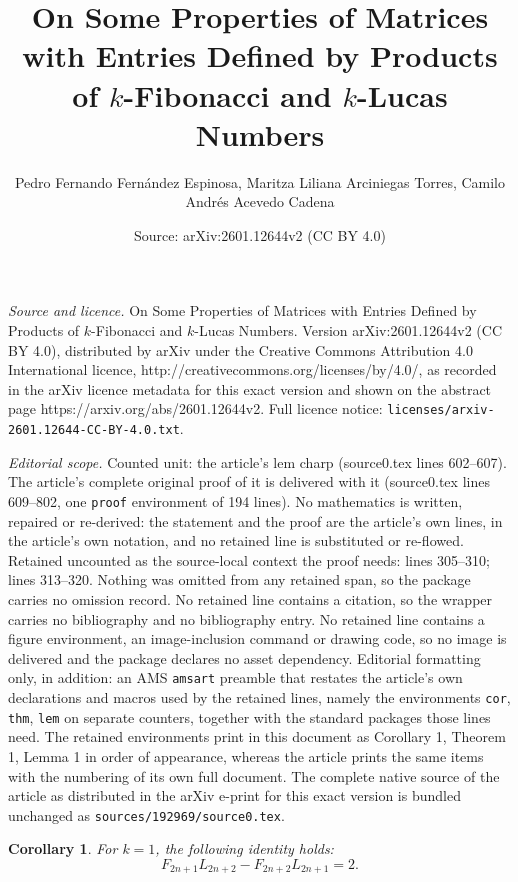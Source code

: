 \documentclass[10pt,a4paper]{amsart}
\title{On Some Properties of Matrices with Entries Defined by Products of $k$-Fibonacci and $k$-Lucas Numbers}
\author{Pedro Fernando Fern\'andez Espinosa, Maritza Liliana Arciniegas Torres, Camilo Andr\'es Acevedo Cadena}
\date{Source: arXiv:2601.12644v2 (CC BY 4.0)}
\newtheorem{cor}{Corollary}
\begin{document}
\maketitle

\noindent\emph{Source and licence.} On Some Properties of Matrices with Entries Defined by Products of $k$-Fibonacci and $k$-Lucas Numbers. Version arXiv:2601.12644v2 (CC BY 4.0), distributed by arXiv under the Creative Commons Attribution 4.0 International licence, http://creativecommons.org/licenses/by/4.0/, as recorded in the arXiv licence metadata for this exact version and shown on the abstract page https://arxiv.org/abs/2601.12644v2. Full licence notice: \texttt{licenses/arxiv-2601.12644-CC-BY-4.0.txt}.\par\smallskip

\noindent\textit{Editorial scope.} Counted unit: the article's lem charp (source0.tex lines 602--607). The article's complete original proof of it is delivered with it (source0.tex lines 609--802, one \texttt{proof} environment of 194 lines). No mathematics is written, repaired or re-derived: the statement and the proof are the article's own lines, in the article's own notation, and no retained line is substituted or re-flowed.  Retained uncounted as the source-local context the proof needs: lines 305--310; lines 313--320.  Nothing was omitted from any retained span, so the package carries no omission record.  No retained line contains a citation, so the wrapper carries no bibliography and no bibliography entry.  No retained line contains a figure environment, an image-inclusion command or drawing code, so no image is delivered and the package declares no asset dependency.  Editorial formatting only, in addition: an AMS \texttt{amsart} preamble that restates the article's own declarations and macros used by the retained lines, namely the environments \texttt{cor}, \texttt{thm}, \texttt{lem} on separate counters, together with the standard packages those lines need.  The retained environments print in this document as Corollary 1, Theorem 1, Lemma 1 in order of appearance, whereas the article prints the same items with the numbering of its own full document.  The complete native source of the article as distributed in the arXiv e-print for this exact version is bundled unchanged as \texttt{sources/192969/source0.tex}.
\begin{cor}\label{aux1}
For $k=1$, the following identity holds:
\[
F_{2n+1}L_{2n+2}-F_{2n+2}L_{2n+1}=2.
\]
\end{cor}
\end{document}

